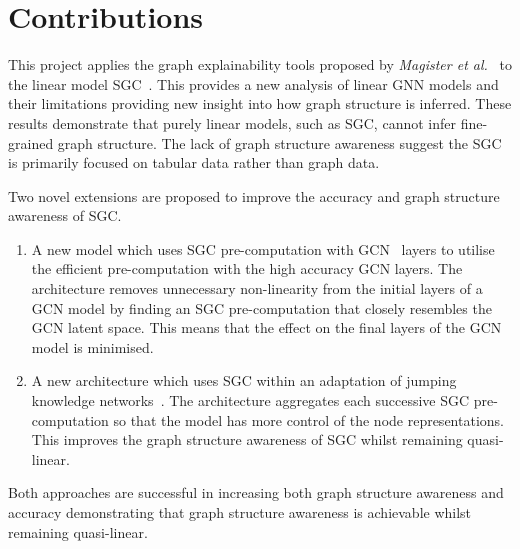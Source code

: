 %
%

\section{Contributions}

This project applies the graph explainability tools proposed by \textit{Magister et al.}~\cite{magister2021gcexplainer} to the linear model SGC~\cite{wu2019simplifying}.
This provides a new analysis of linear GNN models and their limitations providing new insight into how graph structure is inferred.
These results demonstrate that purely linear models, such as SGC, cannot infer fine-grained graph structure.
The lack of graph structure awareness suggest the SGC is primarily focused on tabular data rather than graph data.

Two novel extensions are proposed to improve the accuracy and graph structure awareness of SGC.
\begin{enumerate}
    \item
        A new model which uses SGC pre-computation with GCN~\cite{kipf2016semi} layers to utilise the efficient pre-computation with the high accuracy GCN layers.
        The architecture removes unnecessary non-linearity from the initial layers of a GCN model by finding an SGC pre-computation that closely resembles the GCN latent space.
        This means that the effect on the final layers of the GCN model is minimised.
    \item
        A new architecture which uses SGC within an adaptation of jumping knowledge networks~\cite{xu2018representation}.
        The architecture aggregates each successive SGC pre-computation so that the model has more control of the node representations.
        This improves the graph structure awareness of SGC whilst remaining quasi-linear.
\end{enumerate}
Both approaches are successful in increasing both graph structure awareness and accuracy demonstrating that graph structure awareness is achievable whilst remaining quasi-linear.

